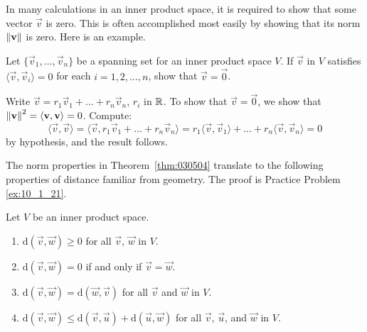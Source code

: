 \documentclass{ximera}
\begin{document}
In many calculations in an inner product space, it is required to show that some vector $\vec{v}$ is zero. This is often accomplished most easily by showing that its norm $\left\lVert\mathbf{v}\right\rVert$ is zero. Here is an example.

\begin{example}\label{030528}
Let $\{\vec{v}_{1}, \dots, \vec{v}_{n}\}$ be a spanning set for an inner product space $V$. If $\vec{v}$ in $V$ satisfies $\langle\vec{v}, \vec{v}_{i}\rangle = 0$ for each $i = 1, 2, \dots, n$, show that $\vec{v} = \vec{0}$.

\begin{explanation}
Write $\vec{v} = r_{1}\vec{v}_{1} + \dots + r_{n}\vec{v}_{n}$, $r_{i}$ in $\mathbb{R}$. To show that $\vec{v} = \vec{0}$, we show that $\left\lVert\mathbf{v}\right\rVert^{2} = \langle\mathbf{v}, \mathbf{v}\rangle = 0$. Compute:
\begin{equation*}
\langle \vec{v}, \vec{v} \rangle
= \langle \vec{v}, r_1\vec{v}_1 + \dots + r_n\vec{v}_n \rangle
= r_1\langle \vec{v}, \vec{v}_1 \rangle + \dots + r_n \langle \vec{v}, \vec{v}_n \rangle
= 0
\end{equation*}
by hypothesis, and the result follows.
\end{explanation}
\end{example}

The norm properties in Theorem~\ref{thm:030504} translate to the following properties of distance familiar from geometry. The proof is Practice Problem \ref{ex:10_1_21}.

\begin{theorem}\label{030545}
Let $V$ be an inner product space.

\begin{enumerate}
\item $\mbox{d}(\vec{v}, \vec{w}) \geq 0$ for all $\vec{v}$, $\vec{w}$ in $V$.

\item $\mbox{d}(\vec{v}, \vec{w}) = 0$ if and only if $\vec{v} = \vec{w}$.

\item $\mbox{d}(\vec{v}, \vec{w}) = \mbox{d}(\vec{w}, \vec{v})$ for all $\vec{v}$ and $\vec{w}$ in $V$.

\item $\mbox{d}(\vec{v}, \vec{w}) \leq \mbox{d}(\vec{v}, \vec{u}) + \mbox{d}(\vec{u}, \vec{w})$ for all $\vec{v}$, $\vec{u}$, and $\vec{w}$ in $V$.

\end{enumerate}
\end{theorem}
\end{document}
